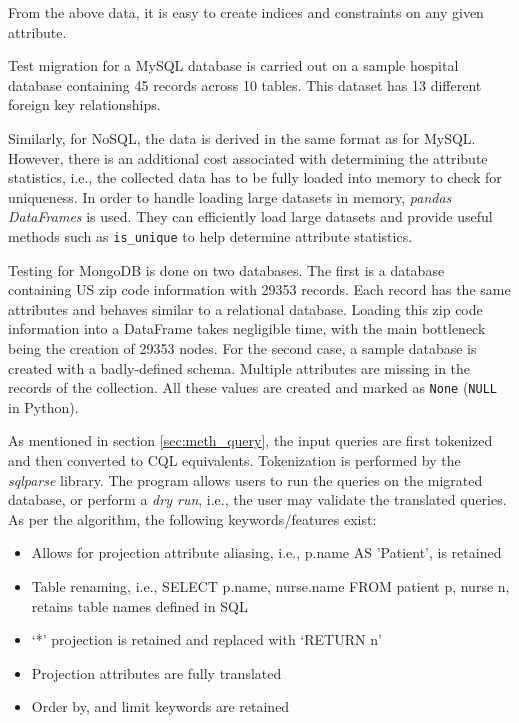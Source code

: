 \documentclass[12pt]{article}
\begin{document}
    From the above data, it is easy to create indices and constraints on any given attribute.

    Test migration for a MySQL database is carried out on a sample hospital database containing 45 records across 10 tables. This dataset has 13 different foreign key relationships.

    Similarly, for NoSQL, the data is derived in the same format as for MySQL. However, there is an additional cost associated with determining the attribute statistics, i.e., the collected data has to be fully loaded into memory to check for uniqueness. In order to handle loading large datasets in memory, \textit{pandas DataFrames} is used. They can efficiently load large datasets and provide useful methods such as \verb|is_unique| to help determine attribute statistics.

    Testing for MongoDB is done on two databases. The first is a database containing US zip code information with 29353 records. Each record has the same attributes and behaves similar to a relational database. Loading this zip code information into a DataFrame takes negligible time, with the main bottleneck being the creation of 29353 nodes. For the second case, a sample database is created with a badly-defined schema. Multiple attributes are missing in the records of the collection. All these values are created and marked as \verb|None| (\verb|NULL| in Python).

    As mentioned in section \ref{sec:meth_query}, the input queries are first tokenized and then converted to CQL equivalents. Tokenization is performed by the \textit{sqlparse} library. The program allows users to run the queries on the migrated database, or perform a \textit{dry run}, i.e., the user may validate the translated queries. As per the algorithm, the following keywords/features exist:
    \begin{itemize}
        \item Allows for projection attribute aliasing, i.e., p.name AS 'Patient', is retained
        \item Table renaming, i.e., SELECT p.name, nurse.name FROM patient p, nurse n, retains table names defined in SQL
        \item `*' projection is retained and replaced with `RETURN n'
        \item Projection attributes are fully translated
        \item Order by, and limit keywords are retained
    \end{itemize}
\end{document}
